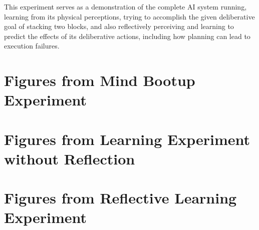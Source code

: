  {This experiment serves as a demonstration of the
  complete AI system running, learning from its physical perceptions,
  trying to accomplish the given deliberative goal of stacking two
  blocks, and also reflectively perceiving and learning to predict the
  effects of its deliberative actions, including how planning can lead
  to execution failures.}


\clearpage
\section{Figures from Mind Bootup Experiment}


\clearpage
\section{Figures from Learning Experiment without Reflection}


\clearpage
\section{Figures from Reflective Learning Experiment}


